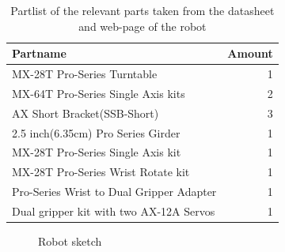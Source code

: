 \begin{table}[htbp]
\centering
\caption{Partlist of the relevant parts taken from the datasheet and web-page of the robot}
\label{table:partlist}
    \begin{tabular}{ l r}
        \toprule
        Partname  & Amount \\
        \midrule
        MX-28T Pro-Series Turntable & 1\\
        MX-64T Pro-Series Single Axis kits& 2\\
        AX Short Bracket(SSB-Short) & 3\\
        2.5 inch(6.35cm) Pro Series Girder & 1 \\
        MX-28T Pro-Series Single Axis kit & 1 \\
        MX-28T Pro-Series Wrist Rotate kit & 1\\
        Pro-Series Wrist to Dual Gripper Adapter & 1\\
        Dual gripper kit with two AX-12A Servos& 1\\
               \bottomrule
    \end{tabular}
\end{table}



\begin{figure}[htbp]
  \centering
  
  \caption{Robot sketch}
  \label{fig:utgangspunkt}
\end{figure}



